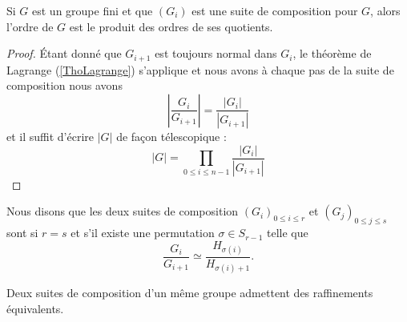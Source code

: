 \begin{proposition}
    Si \( G\) est un groupe fini et que \( (G_i)\) est une suite de composition pour \( G\), alors l'ordre de \( G\) est le produit des ordres de ses quotients.
\end{proposition}

\begin{proof}
    Étant donné que \( G_{i+1}\) est toujours normal dans \( G_i\), le théorème de Lagrange (\ref{ThoLagrange}) s'applique et nous avons à chaque pas de la suite de composition nous avons
    \begin{equation}
        | \frac{ G_i }{ G_{i+1} } |=\frac{ | G_i | }{ | G_{i+1} | }
    \end{equation}
    et il suffit d'écrire \( | G |\) de façon télescopique :
    \begin{equation}
        | G |=\prod_{0\leq i\leq n-1}\frac{ | G_i | }{ | G_{i+1} | }
    \end{equation}
\end{proof}

Nous disons que les deux suites de composition \( (G_i)_{0\leq i\leq r}\) et \( (G_j)_{0\leq j\leq s}\) sont  si \( r=s\) et s'il existe une permutation \( \sigma\in S_{r-1}\) telle que
\begin{equation}
    \frac{ G_i }{ G_{i+1} }\simeq\frac{ H_{\sigma(i)} }{ H_{\sigma(i)+1} }.
\end{equation}

\begin{proposition}[Schreider]
    Deux suites de composition d'un même groupe admettent des raffinements équivalents.
\end{proposition}

